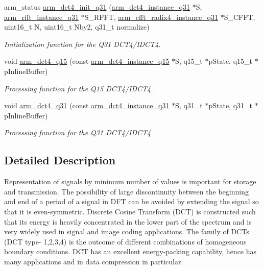 \begin{DoxyCompactItemize}
arm\-\_\-status \hyperlink{group___d_c_t4___i_d_c_t4_ga631bb59c7c97c814ff7147ecba6a716a}{arm\-\_\-dct4\-\_\-init\-\_\-q31} (\hyperlink{structarm__dct4__instance__q31}{arm\-\_\-dct4\-\_\-instance\-\_\-q31} $\ast$S, \hyperlink{structarm__rfft__instance__q31}{arm\-\_\-rfft\-\_\-instance\-\_\-q31} $\ast$S\-\_\-\-R\-F\-F\-T, \hyperlink{structarm__cfft__radix4__instance__q31}{arm\-\_\-cfft\-\_\-radix4\-\_\-instance\-\_\-q31} $\ast$S\-\_\-\-C\-F\-F\-T, uint16\-\_\-t N, uint16\-\_\-t Nby2, q31\-\_\-t normalize)
\begin{DoxyCompactList}\small\item\em Initialization function for the Q31 D\-C\-T4/\-I\-D\-C\-T4. \end{DoxyCompactList}\item 
void \hyperlink{group___d_c_t4___i_d_c_t4_ga114cb9635059f678df291fcc887aaf2b}{arm\-\_\-dct4\-\_\-q15} (const \hyperlink{structarm__dct4__instance__q15}{arm\-\_\-dct4\-\_\-instance\-\_\-q15} $\ast$S, q15\-\_\-t $\ast$p\-State, q15\-\_\-t $\ast$p\-Inline\-Buffer)
\begin{DoxyCompactList}\small\item\em Processing function for the Q15 D\-C\-T4/\-I\-D\-C\-T4. \end{DoxyCompactList}\item 
void \hyperlink{group___d_c_t4___i_d_c_t4_gad04d0baab6ed081d8e8afe02538eb80b}{arm\-\_\-dct4\-\_\-q31} (const \hyperlink{structarm__dct4__instance__q31}{arm\-\_\-dct4\-\_\-instance\-\_\-q31} $\ast$S, q31\-\_\-t $\ast$p\-State, q31\-\_\-t $\ast$p\-Inline\-Buffer)
\begin{DoxyCompactList}\small\item\em Processing function for the Q31 D\-C\-T4/\-I\-D\-C\-T4. \end{DoxyCompactList}\end{DoxyCompactItemize}


\subsection{Detailed Description}
Representation of signals by minimum number of values is important for storage and transmission. The possibility of large discontinuity between the beginning and end of a period of a signal in D\-F\-T can be avoided by extending the signal so that it is even-\/symmetric. Discrete Cosine Transform (D\-C\-T) is constructed such that its energy is heavily concentrated in the lower part of the spectrum and is very widely used in signal and image coding applications. The family of D\-C\-Ts (D\-C\-T type-\/ 1,2,3,4) is the outcome of different combinations of homogeneous boundary conditions. D\-C\-T has an excellent energy-\/packing capability, hence has many applications and in data compression in particular.


